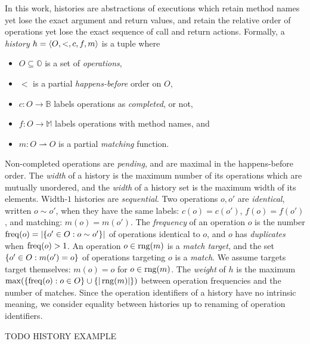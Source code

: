 In this work, histories are abstractions of executions which retain method
names yet lose the exact argument and return values, and retain the relative
order of operations yet lose the exact sequence of call and return actions.
Formally, a \emph{history} $h = {\left\langle{O,<,c,f,m}\right\rangle}$ is a tuple where
\begin{itemize}

  \item $O \subseteq \mathbb{O}$ is a set of \emph{operations},

  \item $<$ is a partial \emph{happens-before} order on $O$,

  \item $c: O \to \mathbb{B}$ labels operations as \emph{completed}, or not,

  \item $f: O \to \mathbb{M}$ labels operations with method names, and

  \item $m: O \rightharpoonup O$ is a partial \emph{matching} function.

\end{itemize}
Non-completed operations are \emph{pending}, and are maximal in the
happens-before order. The \emph{width} of a history is the maximum number of
its operations which are mutually unordered, and the \emph{width} of a history
set is the maximum width of its elements. Width-$1$ histories are
\emph{sequential}.
Two operations $o, o'$ are \emph{identical}, written $o \sim o'$, when they
have the same labels: $c(o) = c(o')$, $f(o) = f(o')$, and matching: $m(o) =
m(o')$. The \emph{frequency} of an operation $o$ is the number $\operatorname{freq}(o) =
|{\{{ o' \in O : o \sim o' }\}}|$ of operations identical to $o$, and $o$ has
\emph{duplicates} when $\operatorname{freq}(o) > 1$. An operation $o \in \operatorname{rng}(m)$ is a
\emph{match target}, and the set ${\{{ o' \in O : m(o') = o}\}}$ of operations
targeting $o$ is a \emph{match}. We assume targets target themselves: $m(o) =
o$ for $o \in \operatorname{rng}(m)$. The \emph{weight} of $h$ is the maximum $\max({\{{
\operatorname{freq}(o) : o \in O }\}} \cup {\{{|\operatorname{rng}(m)|}\}})$ between operation frequencies and
the number of matches. Since the operation identifiers of a history have no
intrinsic meaning, we consider equality between histories up to renaming of
operation identifiers.

\begin{example}

  TODO HISTORY EXAMPLE

\end{example}

